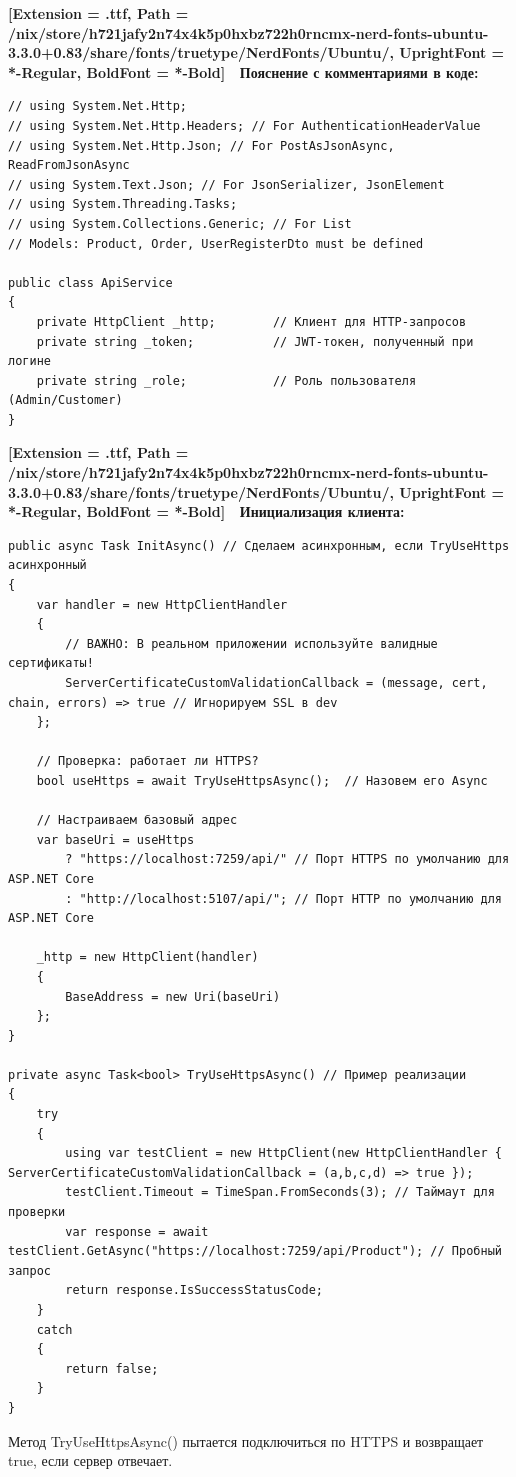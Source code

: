 \documentclass[12pt]{article}
\newcommand{\icon}[1]{\fontspec{UbuntuNerdFont}[Extension = .ttf,
  Path = /nix/store/h721jafy2n74x4k5p0hxbz722h0rncmx-nerd-fonts-ubuntu-3.3.0+0.83/share/fonts/truetype/NerdFonts/Ubuntu/,
  UprightFont = *-Regular,
BoldFont = *-Bold] #1}
\newcommand{\iicon}[1]{{\icon{#1}}}
\renewcommand{\texttt}[1]{{\small\ttfamily #1}}
\numberwithin{listing}{section}
\numberwithin{figure}{section}
\begin{document}
\noindent \textbf{\iicon{} Пояснение с комментариями в коде:}
\begin{verbatim}
// using System.Net.Http;
// using System.Net.Http.Headers; // For AuthenticationHeaderValue
// using System.Net.Http.Json; // For PostAsJsonAsync, ReadFromJsonAsync
// using System.Text.Json; // For JsonSerializer, JsonElement
// using System.Threading.Tasks;
// using System.Collections.Generic; // For List
// Models: Product, Order, UserRegisterDto must be defined

public class ApiService
{
    private HttpClient _http;        // Клиент для HTTP-запросов
    private string _token;           // JWT-токен, полученный при логине
    private string _role;            // Роль пользователя (Admin/Customer)
}
\end{verbatim}

\noindent \textbf{\iicon{} Инициализация клиента:}
\begin{verbatim}
public async Task InitAsync() // Сделаем асинхронным, если TryUseHttps асинхронный
{
    var handler = new HttpClientHandler
    {
        // ВАЖНО: В реальном приложении используйте валидные сертификаты!
        ServerCertificateCustomValidationCallback = (message, cert, chain, errors) => true // Игнорируем SSL в dev
    };

    // Проверка: работает ли HTTPS?
    bool useHttps = await TryUseHttpsAsync();  // Назовем его Async

    // Настраиваем базовый адрес
    var baseUri = useHttps
        ? "https://localhost:7259/api/" // Порт HTTPS по умолчанию для ASP.NET Core
        : "http://localhost:5107/api/"; // Порт HTTP по умолчанию для ASP.NET Core

    _http = new HttpClient(handler)
    {
        BaseAddress = new Uri(baseUri)
    };
}

private async Task<bool> TryUseHttpsAsync() // Пример реализации
{
    try
    {
        using var testClient = new HttpClient(new HttpClientHandler { ServerCertificateCustomValidationCallback = (a,b,c,d) => true });
        testClient.Timeout = TimeSpan.FromSeconds(3); // Таймаут для проверки
        var response = await testClient.GetAsync("https://localhost:7259/api/Product"); // Пробный запрос
        return response.IsSuccessStatusCode;
    }
    catch
    {
        return false;
    }
}
\end{verbatim}
Метод \texttt{TryUseHttpsAsync()} пытается подключиться по HTTPS и возвращает \texttt{true}, если сервер отвечает.
\end{document}
